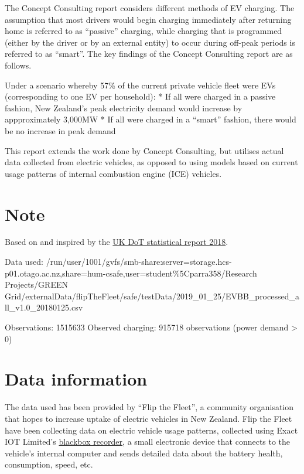 \documentclass[]{article}
\begin{document}
The Concept Consulting report considers different methods of EV
charging. The assumption that most drivers would begin charging
immediately after returning home is referred to as ``passive'' charging,
while charging that is programmed (either by the driver or by an
external entity) to occur during off-peak periods is referred to as
``smart''. The key findings of the Concept Consulting report are as
follows.

Under a scenario whereby 57\% of the current private vehicle fleet were
EVs (corresponding to one EV per household): * If all were charged in a
passive fashion, New Zealand's peak electricity demand would increase by
appproximately 3,000MW * If all were charged in a ``smart'' fashion,
there would be no increase in peak demand

This report extends the work done by Concept Consulting, but utilises
actual data collected from electric vehicles, as opposed to using models
based on current usage patterns of internal combustion engine (ICE)
vehicles.

\section{Note}\label{note}

Based on and inspired by the
\href{https://assets.publishing.service.gov.uk/government/uploads/system/uploads/attachment_data/file/764270/electric-chargepoint-analysis-2017-domestics.pdf}{UK
DoT statistical report 2018}.

Data used:
/run/user/1001/gvfs/smb-share:server=storage.hcs-p01.otago.ac.nz,share=hum-csafe,user=student\%5Cparra358/Research
Projects/GREEN
Grid/externalData/flipTheFleet/safe/testData/2019\_01\_25/EVBB\_processed\_all\_v1.0\_20180125.csv

Observations: 1515633 Observed charging: 915718 observations (power
demand \textgreater{} 0)

\section{Data information}\label{data}

The data used has been provided by ``Flip the Fleet'', a community
organisation that hopes to increase uptake of electric vehicles in New
Zealand. Flip the Fleet have been collecting data on electric vehicle
usage patterns, collected using Exact IOT Limited's
\href{https://flipthefleet.org/ev-black-box/}{blackbox recorder}, a
small electronic device that connects to the vehicle's internal computer
and sends detailed data about the battery health, consumption, speed,
etc.
\end{document}
